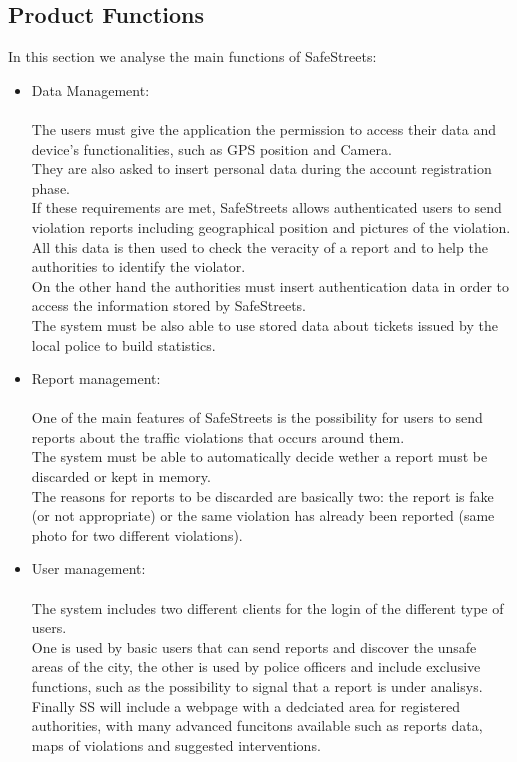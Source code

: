 \subsection{Product Functions}
In this section we analyse the main functions of SafeStreets: 
\begin{itemize}
	\item Data Management: \\ \\
	The users must give the application the permission to access their data and device’s functionalities, such as GPS position and Camera. \\
	They are also asked to insert personal data during the account registration phase. \\
	If these requirements are met, SafeStreets allows authenticated users to send violation reports including geographical position and pictures of the violation. \\
	All this data is then used to check the veracity of a report and to help the authorities to identify the violator. \\
	On the other hand the authorities must insert authentication data in order to access the information stored by SafeStreets. \\
	The system must be also able to use stored data about tickets issued by the local police to build statistics.
	
	\item Report management: \\ \\
	One of the main features of SafeStreets is the possibility for users to send reports about the traffic violations that occurs around them. \\
	The system must be able to automatically decide wether a report must be discarded or kept in memory. \\
	The reasons for reports to be discarded are basically two: the report is fake (or not appropriate) or the same violation has already been reported (same photo for two different violations). 
	
	\item User management: \\ \\
	The system includes two different clients for the login of the different type of users. \\
	One is used by basic users that can send reports and discover the unsafe areas of the city, the other is used by police officers and include exclusive functions, such as the possibility to signal that a report is under analisys. \\
	Finally SS will include a webpage with a dedciated area for registered authorities, with many advanced funcitons available such as  reports data, maps of violations and suggested interventions. \\
	

\end{itemize}
